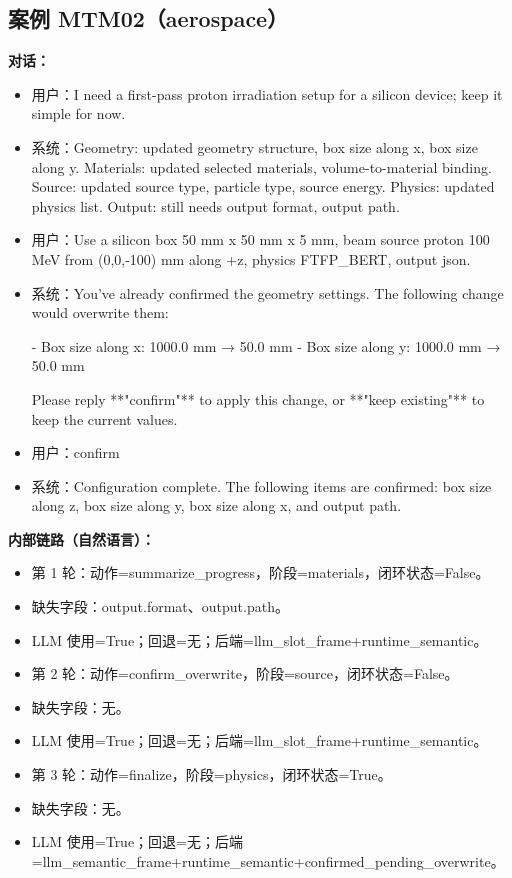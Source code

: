\documentclass[11pt]{ctexart}
\begin{document}
\subsection{案例 MTM02（aerospace）}
\textbf{对话：}
\begin{itemize}
\item 用户：I need a first-pass proton irradiation setup for a silicon device; keep it simple for now.
\item 系统：Geometry: updated geometry structure, box size along x, box size along y. Materials: updated selected materials, volume-to-material binding. Source: updated source type, particle type, source energy. Physics: updated physics list. Output: still needs output format, output path.
\item 用户：Use a silicon box 50 mm x 50 mm x 5 mm, beam source proton 100 MeV from (0,0,-100) mm along +z, physics FTFP\_BERT, output json.
\item 系统：You've already confirmed the geometry settings. The following change would overwrite them:

- Box size along x: 1000.0 mm → 50.0 mm
- Box size along y: 1000.0 mm → 50.0 mm

Please reply **"confirm"** to apply this change, or **"keep existing"** to keep the current values.
\item 用户：confirm
\item 系统：Configuration complete. The following items are confirmed: box size along z, box size along y, box size along x, and output path.
\end{itemize}
\textbf{内部链路（自然语言）：}
\begin{itemize}
\item 第 1 轮：动作=summarize\_progress，阶段=materials，闭环状态=False。
\item 缺失字段：output.format、output.path。
\item LLM 使用=True；回退=无；后端=llm\_slot\_frame+runtime\_semantic。
\item 第 2 轮：动作=confirm\_overwrite，阶段=source，闭环状态=False。
\item 缺失字段：无。
\item LLM 使用=True；回退=无；后端=llm\_slot\_frame+runtime\_semantic。
\item 第 3 轮：动作=finalize，阶段=physics，闭环状态=True。
\item 缺失字段：无。
\item LLM 使用=True；回退=无；后端=llm\_semantic\_frame+runtime\_semantic+confirmed\_pending\_overwrite。
\end{itemize}
\end{document}
